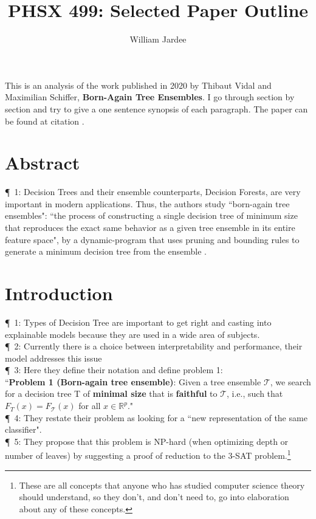 \documentclass[11pt]{article}
\begin{document}
\title{PHSX 499: Selected Paper Outline}
\author{William Jardee}
\maketitle

This is an analysis of the work published in 2020 by Thibaut Vidal and Maximilian Schiffer, \textbf{Born-Again Tree Ensembles}. I go through section by section and try to give a one sentence synopsis of each paragraph. The paper can be found at citation \cite{pmlr-v119-vidal20a}.

\section*{Abstract}
\P\, 1: Decision Trees and their ensemble counterparts, Decision Forests, are very important in modern applications. Thus, the authors study ``born-again tree ensembles": ``the process of constructing a single decision tree of minimum size that reproduces the exact same behavior as a given tree ensemble in its entire feature space", by a dynamic-program that uses pruning and bounding rules to generate a minimum decision tree from the ensemble \cite{pmlr-v119-vidal20a}.


\section{Introduction}	
\P\, 1: Types of Decision Tree are important to get right and casting into explainable models because they are used in a wide area of subjects.\\
\P\, 2: Currently there is a choice between interpretability and performance, their model addresses this issue\\
\P\, 3: Here they define their notation and define problem 1:\\
\quad ``\textbf{Problem 1 (Born-again tree ensemble)}: Given a tree ensemble $\mathcal{T}$, we search for a decision tree T of \textbf{minimal size} that is \textbf{faithful} to $\mathcal{T}$, i.e., such that $F_T(x) = F_\mathcal{T}(x)$ for all $x \in \mathbb{R}^p$."\\
\P\, 4: They restate their problem as looking for a ``new representation of the same classifier".\\
\P\, 5: They propose that this problem is NP-hard (when optimizing depth or number of leaves) by suggesting a proof of reduction to the 3-SAT problem.\footnote{These are all concepts that anyone who has studied computer science theory should understand, so they don't, and don't need to, go into elaboration about any of these concepts.}
\end{document}
